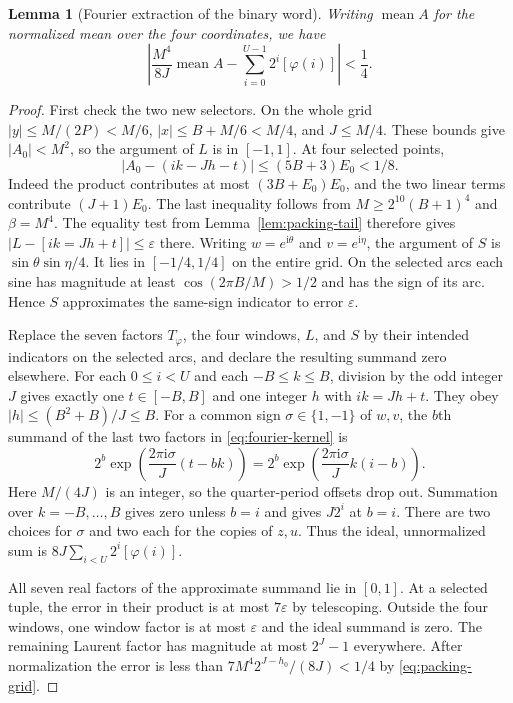 \documentclass[11pt,letterpaper]{article}
\newtheorem{lemma}[theorem]{Lemma}
\numberwithin{equation}{section}
\begin{document}
\begin{lemma}[Fourier extraction of the binary word]\label{lem:fourier-packing}
Writing $\operatorname{mean} A$ for the normalized mean over the four
coordinates, we have
\[
 \left|\frac{M^4}{8J}\operatorname{mean} A
       -\sum_{i=0}^{U-1}2^i[\varphi(i)]\right|<\frac14 .
\]
\end{lemma}
\begin{proof}
First check the two new selectors. On the whole grid
$|y|\le M/(2P)<M/6$, $|x|\le B+M/6<M/4$, and $J\le M/4$.
These bounds give $|A_0|<M^2$, so the argument of $L$ is in $[-1,1]$.
At four selected points,
\[
 |A_0-(ik-Jh-t)|\le (5B+3)E_0<1/8 .
\]
Indeed the product contributes at most $(3B+E_0)E_0$, and the two
linear terms contribute $(J+1)E_0$. The last inequality follows from
$M\ge 2^{10}(B+1)^4$ and $\beta=M^4$.
The equality test from Lemma~\ref{lem:packing-tail} therefore gives
$|L-[ik=Jh+t]|\le\varepsilon$ there. Writing
$w=e^{\mathrm i\theta}$ and $v=e^{\mathrm i\eta}$, the argument of
$S$ is $\sin\theta\sin\eta/4$. It lies in $[-1/4,1/4]$ on the entire
grid. On the selected arcs each sine has magnitude at least
$\cos(2\pi B/M)>1/2$ and has the sign of its arc. Hence $S$
approximates the same-sign indicator to error $\varepsilon$.

Replace the seven factors $T_\varphi$, the four windows, $L$, and
$S$ by their intended indicators on the selected arcs, and declare the
resulting summand zero elsewhere. For each $0\le i<U$ and each
$-B\le k\le B$, division by the odd integer $J$ gives exactly one
$t\in[-B,B]$ and one integer $h$ with $ik=Jh+t$. They obey
$|h|\le(B^2+B)/J\le B$. For a common sign $\sigma\in\{1,-1\}$ of
$w,v$, the $b$th summand of the last two factors in
\eqref{eq:fourier-kernel} is
\[
 2^b\exp\!\left(\frac{2\pi\mathrm i\sigma}{J}(t-bk)\right)
   =2^b\exp\!\left(\frac{2\pi\mathrm i\sigma}{J}k(i-b)\right).
\]
Here $M/(4J)$ is an integer, so the quarter-period offsets drop out.
Summation over $k=-B,\ldots,B$ gives zero unless $b=i$ and gives
$J2^i$ at $b=i$. There are two choices for $\sigma$ and two each for
the copies of $z,u$. Thus the ideal, unnormalized sum is
$8J\sum_{i<U}2^i[\varphi(i)]$.

All seven real factors of the approximate summand lie in $[0,1]$.
At a selected tuple, the error in their product is at most
$7\varepsilon$ by telescoping. Outside the four windows, one window
factor is at most $\varepsilon$ and the ideal summand is zero.
The remaining Laurent factor has magnitude at most $2^J-1$
everywhere. After normalization the error is less than
$7M^4 2^{J-h_0}/(8J)<1/4$ by \eqref{eq:packing-grid}.
\end{proof}
\end{document}
